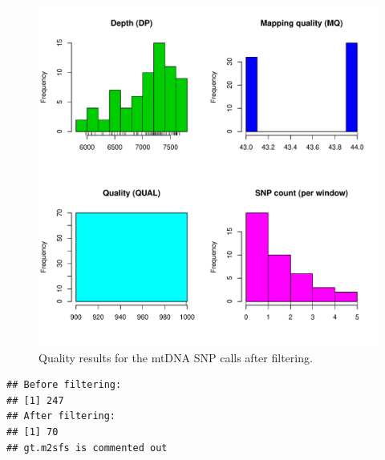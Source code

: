 \documentclass{article}\usepackage[]{graphicx}\usepackage[]{color}
\makeatletter
\def\maxwidth{ %
  \ifdim\Gin@nat@width>\linewidth
    \linewidth
  \else
    \Gin@nat@width
  \fi
}
\newenvironment{kframe}{%
 \def\at@end@of@kframe{}%
 \ifinner\ifhmode%
  \def\at@end@of@kframe{\end{minipage}}%
  \begin{minipage}{\columnwidth}%
 \fi\fi%
 \def\FrameCommand##1{\hskip\@totalleftmargin \hskip-\fboxsep
 \colorbox{shadecolor}{##1}\hskip-\fboxsep
     \hskip-\linewidth \hskip-\@totalleftmargin \hskip\columnwidth}%
 \MakeFramed {\advance\hsize-\width
   \@totalleftmargin\z@ \linewidth\hsize
   \@setminipage}}%
 {\par\unskip\endMakeFramed%
 \at@end@of@kframe}
\newenvironment{knitrout}{}{} %
\makeatother
\begin{document}
\begin{knitrout}
\color{fgcolor}\begin{figure}[h!]

\includegraphics[width=\maxwidth]{figure/plot_filter} \caption[Quality results for the mtDNA SNP calls after filtering]{Quality results for the mtDNA SNP calls after filtering.\label{fig:plot_filter}}
\end{figure}


\end{knitrout}


\begin{knitrout}
\color{fgcolor}\begin{kframe}
\begin{verbatim}
## Before filtering:
## [1] 247
## After filtering:
## [1] 70
## gt.m2sfs is commented out
\end{verbatim}
\end{kframe}
\end{knitrout}
\end{document}
